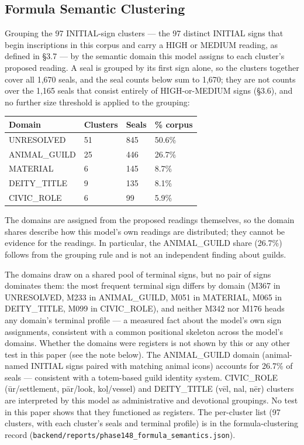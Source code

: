 \documentclass[11pt]{article}
\newcounter{none} %
\begin{document}
\subsection{Formula Semantic Clustering
}\label{formula-semantic-clustering-phase-148}

Grouping the 97 INITIAL-sign clusters --- the 97 distinct INITIAL signs that begin inscriptions in this corpus and carry a HIGH or MEDIUM reading, as defined in §3.7 --- by the semantic domain this model assigns to each cluster's proposed reading. A seal is grouped by its first sign alone, so the clusters together cover all 1,670 seals, and the seal counts below sum to 1,670; they are not counts over the 1,165 seals that consist entirely of HIGH-or-MEDIUM signs (§3.6), and no further size threshold is applied to the grouping:

{\def\LTcaptype{none} %
\begin{longtable}[]{@{}llll@{}}
\toprule\noalign{}
Domain & Clusters & Seals & \% corpus \\
\midrule\noalign{}
\endhead
\bottomrule\noalign{}
\endlastfoot
UNRESOLVED & 51 & 845 & 50.6\% \\
ANIMAL\_GUILD & 25 & 446 & 26.7\% \\
MATERIAL & 6 & 145 & 8.7\% \\
DEITY\_TITLE & 9 & 135 & 8.1\% \\
CIVIC\_ROLE & 6 & 99 & 5.9\% \\ \end{longtable} }

The domains are assigned from the proposed readings themselves, so the domain shares describe how this model's own readings are distributed; they cannot be evidence for the readings. In particular, the ANIMAL\_GUILD share (26.7\%) follows from the grouping rule and is not an independent finding about guilds.

The domains draw on a shared pool of terminal signs, but no pair of signs dominates them: the most frequent terminal sign differs by domain (M367 in UNRESOLVED, M233 in ANIMAL\_GUILD, M051 in MATERIAL, M065 in DEITY\_TITLE, M099 in CIVIC\_ROLE), and neither M342 nor M176 heads any domain's terminal profile --- a measured fact about the model's own sign assignments, consistent with a common positional skeleton across the model's domains. Whether the domains were registers is not shown by this or any other test in this paper (see the note below). The
ANIMAL\_GUILD domain (animal-named INITIAL signs paired with matching
animal icons) accounts for 26.7\% of seals --- consistent with a
totem-based guild identity system. CIVIC\_ROLE (ūr/settlement, pār/look, koḷ/vessel) and DEITY\_TITLE (vēl, nal, nēr) clusters are interpreted by this model as administrative and devotional groupings. No test in this paper shows that they functioned as registers. The per-cluster list (97 clusters, with each cluster's seals and terminal profile) is in the formula-clustering record (\texttt{backend/reports/phase148\_formula\_semantics.json}).
\end{document}
